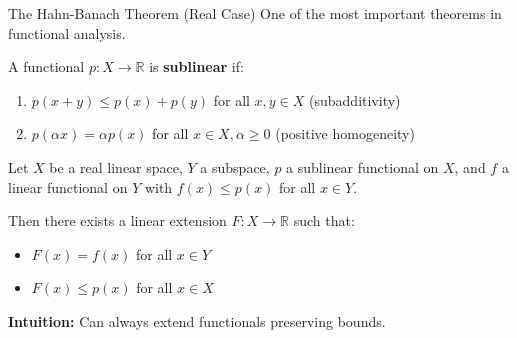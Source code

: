 \documentclass[aspectratio=169,10pt]{beamer}
\begin{document}
\begin{frame}{The Hahn-Banach Theorem (Real Case)}
  One of the most important theorems in functional analysis.

  \vspace{0.3cm}
  \begin{definition}
    A functional $p : X \to \mathbb{R}$ is \textbf{sublinear} if:
    \begin{enumerate}
      \item $p(x + y) \leq p(x) + p(y)$ for all $x, y \in X$ (subadditivity)
      \item $p(\alpha x) = \alpha p(x)$ for all $x \in X, \alpha \geq 0$ (positive homogeneity)
    \end{enumerate}
  \end{definition}

  \vspace{0.3cm}
  \begin{theorem}
    Let $X$ be a real linear space, $Y$ a subspace, $p$ a sublinear functional on $X$, and $f$ a linear functional on $Y$ with $f(x) \leq p(x)$ for all $x \in Y$.

    Then there exists a linear extension $F : X \to \mathbb{R}$ such that:
    \begin{itemize}
      \item $F(x) = f(x)$ for all $x \in Y$
      \item $F(x) \leq p(x)$ for all $x \in X$
    \end{itemize}
  \end{theorem}

  \vspace{0.2cm}
  \textbf{Intuition:} Can always extend functionals preserving bounds.
\end{frame}
\end{document}
